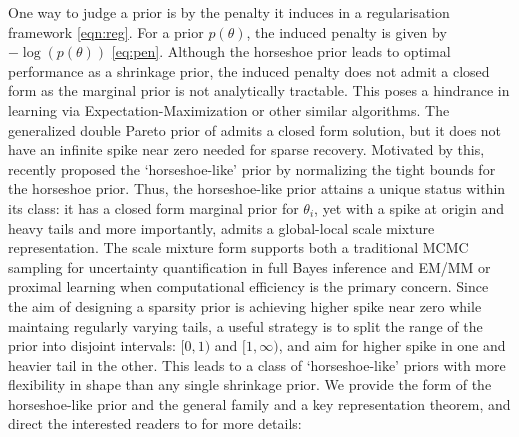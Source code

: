 \documentclass[11pt]{article}
\numberwithin{equation}{section}
\begin{document}
One way to judge a prior is by the penalty it induces in a regularisation framework \eqref{eqn:reg}. For a prior $p(\theta)$, the induced penalty is given by $-\log(p(\theta))$ \eqref{eq:pen}. Although the horseshoe prior leads to optimal performance as a shrinkage prior, the induced penalty does not admit a closed form as the marginal prior is not analytically tractable. This poses a hindrance in learning via Expectation-Maximization or other similar algorithms. The generalized double Pareto prior of \citet{armagan2011generalized} admits a closed form solution, but it does not have an infinite spike near zero needed for sparse recovery. Motivated by this, \citet{bhadra2017horseshoe} recently proposed the `horseshoe-like' prior by normalizing the tight bounds for the horseshoe prior. Thus, the horseshoe-like prior attains a unique status within its class: it has a closed form marginal prior for $\theta_i$, yet with a spike at origin and heavy tails and more importantly, admits a global-local scale mixture representation. The scale mixture form supports both a traditional MCMC sampling for uncertainty quantification in full Bayes inference and EM/MM or proximal learning when computational efficiency is the primary concern. Since the aim of designing a sparsity prior is achieving higher spike near zero while maintaing regularly varying tails, a useful strategy is to split the range of the prior into disjoint intervals: $[0,1)$ and $[1, \infty)$, and aim for higher spike in one and heavier tail in the other. This leads to a class of `horseshoe-like' priors with more flexibility in shape than any single shrinkage prior. We provide the form of the horseshoe-like prior and the general family and a key representation theorem, and direct the interested readers to \citet{bhadra2017horseshoe} for more details: 
\end{document}
